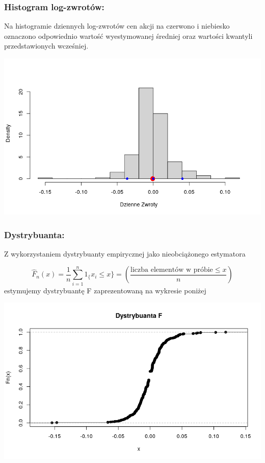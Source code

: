 \documentclass[a4paper,11pt]{article}
\begin{document}
\subsubsection{Histogram log-zwrotów:}
Na histogramie dziennych log-zwrotów cen akcji na czerwono i niebiesko oznaczono odpowiednio wartość wyestymowanej średniej oraz wartości kwantyli przedstawionych wcześniej.

\centerline{\includegraphics[width=1\textwidth]{./Kajtek/img/histogram_zwrotow.png}}


\newpage
\subsubsection{Dystrybuanta:}
Z wykorzystaniem dystrybuanty empirycznej jako nieobciążonego estymatora 

$$\hat{F}_n(x) = \frac{1}{n} \sum_{i=1}^{n} 1_\{x_i \leq x\} = \left(\frac{\text{liczba  elementów  w  próbie} \leq x}{n}\right)$$
estymujemy dystrybuantę F zaprezentowaną na wykresie poniżej

\centerline{\includegraphics[width=1\textwidth]{./Kajtek/img/dystrybuanta.png}}
\end{document}
